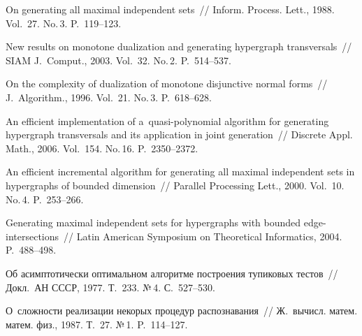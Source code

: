  \begin{multicols}{2}

\renewcommand{\bibname}{\protect\rmfamily Литература}

{\small\frenchspacing
{%
\begin{thebibliography}{99}


      On generating all maximal independent sets~//
      Inform. Process. Lett., 1988. Vol.~27. No.\,3. P.~119--123.
    
      New results on monotone dualization and generating hypergraph
    transversals~//
      SIAM J.~Comput., 2003. Vol.~32. No.\,2. P.~514--537.
    
      On the complexity of dualization of monotone disjunctive normal
    forms~//
      J.~Algorithm., 1996. Vol.~21. No.\,3. P.~618--628.
    
      An efficient implementation of a~quasi-polynomial algorithm for
    generating hypergraph transversals and its application in joint generation~//
      Discrete Appl. Math., 2006. Vol.~154. No.\,16. P.~2350--2372.
    
      An efficient incremental algorithm for generating all maximal
    independent sets in hypergraphs of bounded dimension~//
      Parallel Processing Lett., 2000. Vol.~10. No.\,4. P.~253--266.
    
      Generating maximal independent sets for hypergraphs with bounded edge-intersections~//
      Latin American Symposium on Theoretical Informatics, 2004. P.~488--498.
    
      Об асимптотически оптимальном алгоритме построения тупиковых тестов~//
      Докл.\ АН СССР, 1977.
    Т.~233. №\,4. С.~527--530.
    
      О~сложности реализации некорых процедур
      распознавания~//
      Ж.\ вычисл. матем. матем. физ., 1987.
    Т.~27. №\,1. P.~114--127.
    

\end{thebibliography}}}
\end{multicols}
